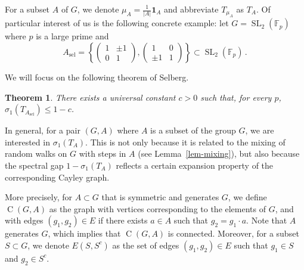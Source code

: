 \documentclass[12pt]{amsart}
\newtheorem{theorem}{Theorem}[section]
\newcommand{\F}{\mathbb{F}}
\begin{document}
For a subset $A$ of $G$, we denote $\mu_A=\tfrac{1}{|A|}\mathbf{1}_A$ and abbreviate $T_{\mu_A}$ as $T_A$. Of particular interest of us is the following concrete example: let $G=\operatorname{SL}_2(\F_p)$ where $p$ is a large prime and 
\[
A_{\operatorname{sel}}=\left\{\left(\begin{matrix}
    1&\pm 1\\
    0&1
\end{matrix}\right),\left(\begin{matrix}
    1&0\\
    \pm 1&1
\end{matrix}\right)\right\}\subset \operatorname{SL}_2(\F_p)\,.
\]

We will focus on the following theorem of Selberg.

\begin{theorem}\label{thm-selb}
    There exists a universal constant $c>0$ such that, for every $p$,  $\sigma_1(T_{A_{\operatorname{sel}}})\le 1-c$. 
\end{theorem}
In general, for a pair $(G,A)$ where $A$ is a subset of the group $G$, we are interested in $\sigma_1(T_A)$. This is not only because it is related to the mixing of random walks on $G$ with steps in $A$ (see Lemma~\ref{lem-mixing}), but also because the spectral gap $1-\sigma_1(T_A)$ reflects a certain expansion property of the corresponding Cayley graph.

More precisely, for $A \subset G$ that is symmetric and generates $G$, we define $\operatorname{C}(G,A)$ as the graph with vertices corresponding to the elements of $G$, and with edges $(g_1, g_2) \in E$ if there exists $a \in A$ such that $g_2 = g_1 \cdot a$. Note that $A$ generates $G$, which implies that $\operatorname{C}(G,A)$ is connected. Moreover, for a subset $S \subset G$, we denote $E(S, S^c)$ as the set of edges $(g_1, g_2) \in E$ such that $g_1 \in S$ and $g_2 \in S^c$.
\end{document}
